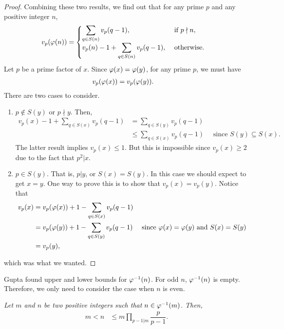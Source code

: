 \documentclass{subfile}
\begin{document}
\begin{proof}
			Combining these two results, we find out that for any prime $p$ and any positive integer $n$,
				\begin{align*}
					v_p(\varphi (n)) & = 
						\begin{cases}
							\displaystyle\sum_{q\in S(n)}v_p(q-1),&\text{ if }p\nmid n,\\
							v_p(n)-1+\displaystyle \sum_{q\in S(n)}v_p(q-1),&\text{ otherwise}.
						\end{cases}
				\end{align*}
			Let $p$ be a prime factor of $x$. Since $\varphi (x)=\varphi (y)$, for any prime $p$, we must have
				\begin{align*}
					v_p(\varphi (x)) & = v_p(\varphi (y)).
				\end{align*}
			There are two cases to consider.
				\begin{enumerate}[1.]
					\item $p\notin S(y)$ or $p\nmid y$. Then,
							\begin{align*}
								v_p(x)-1+\sum_{q\in S(x)}v_p(q-1) & = \sum_{q\in S(y)}v_p(q-1)\\
																	  & \leq\sum_{q\in S(x)}v_p(q-1) \quad \text{ since }S(y)\subseteq S(x).
							\end{align*}
						The latter result implies $v_p(x) \leq 1.$ But this is impossible since $v_p(x)\geq2$ due to the fact that $p^2|x$.
					\item $p\in S(y)$. That is, $p|y$, or $S(x)=S(y)$. In this case we should expect to get $x=y$. One way to prove this is to show that $v_p(x)=v_p(y)$. Notice that
						\begin{align*}
							v_p(x) & = v_p(\varphi (x))+1-\sum_{q\in S(x)} v_p(q-1)\\
									 & = v_p(\varphi (y))+1-\sum_{q\in S(y)} v_p(q-1)\quad \text{ since }\varphi (x)=\varphi (y)\text{ and }S(x)=S(y)\\
									 & = v_p(y),
						\end{align*}
				\end{enumerate}
			which was what we wanted.
		\end{proof}
	
	Gupta \cite{gupta} found upper and lower bounds for $\varphi ^{-1}(n)$. For odd $n$, $\varphi ^{-1}(n)$ is empty. Therefore, we only need to consider the case when $n$ is even. 
		\begin{theorem}[Gupta]\slshape\label{thm:gupta}
			Let $m$ and $n$ be two positive integers such that $n\in\varphi ^{-1}(m)$. Then,
				\begin{align*}
					m < n & \leq m\prod_{p-1|m}\dfrac{p}{p-1}.
				\end{align*}
		\end{theorem}
		
\end{document}
